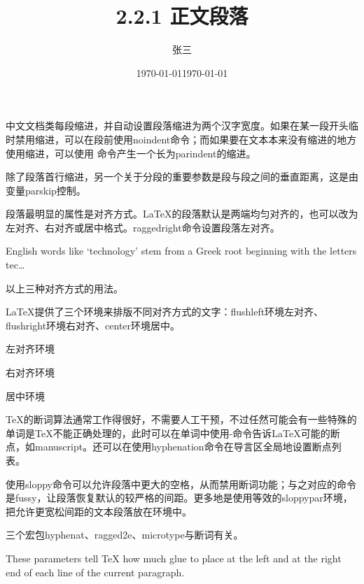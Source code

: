 \documentclass[UTF8]{ctexart}
\title{2.2.1 正文段落}
\author{张三}
\date{\today}
\begin{document}
\maketitle

\noindent
中文文档类每段缩进，并自动设置段落缩进为两个汉字宽度。如果在某一段开头临时禁用缩进，可以在段前使用noindent命令；而如果要在文本本来没有缩进的地方使用缩进，可以使用
\indent
命令产生一个长为parindent的缩进。

除了段落首行缩进，另一个关于分段的重要参数是段与段之间的垂直距离，这是由变量parskip控制。

段落最明显的属性是对齐方式。LaTeX的段落默认是两端均匀对齐的，也可以改为左对齐、右对齐或居中格式。raggedright命令设置段落左对齐。

\raggedright
English words like `technology' stem from a Greek root beginning with the letters tec\dots

\raggedleft
\date{\today}

\centering
以上三种对齐方式的用法。

\raggedright
LaTeX提供了三个环境来排版不同对齐方式的文字：flushleft环境左对齐、flushright环境右对齐、center环境居中。

\begin{flushleft}
左对齐环境
\end{flushleft}

\begin{flushright}
右对齐环境
\end{flushright}

\begin{center}
居中环境
\end{center}

TeX的断词算法通常工作得很好，不需要人工干预，不过任然可能会有一些特殊的单词是TeX不能正确处理的，此时可以在单词中使用-命令告诉LaTeX可能的断点，如man\-u\-script。还可以在使用hyphenation命令在导言区全局地设置断点列表。

\begin{sloppypar}
使用sloppy命令可以允许段落中更大的空格，从而禁用断词功能；与之对应的命令是fussy，让段落恢复默认的较严格的间距。更多地是使用等效的sloppypar环境，把允许更宽松间距的文本段落放在环境中。
\end{sloppypar}

三个宏包hyphenat、ragged2e、microtype与断词有关。

\setlength\leftskip{4em}
\setlength\rightskip{4em}
These parameters tell \TeX{} how much glue to place at the left and at the right end of each line of the current paragraph.
\end{document}
